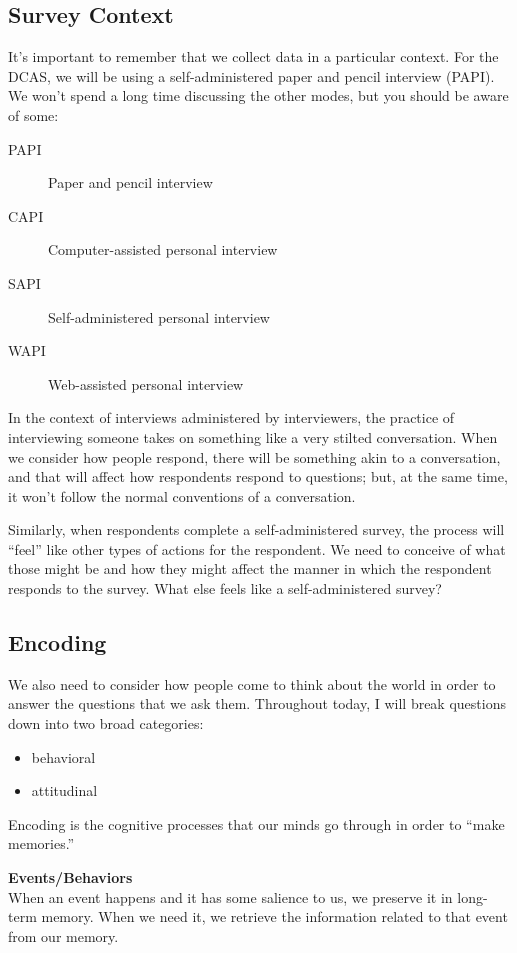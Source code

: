 \documentclass[11pt]{lecturenotes}
\begin{document}
\subsection[5]{Survey Context}
\slide
It's important to remember that we collect data in a particular context. For the DCAS, we will be using a self-administered paper and pencil interview (PAPI). We won't spend a long time discussing the other modes, but you should be aware of some: 

\begin{description}
\item[PAPI] Paper and pencil interview
\item[CAPI] Computer-assisted personal interview
\item[SAPI] Self-administered personal interview
\item[WAPI] Web-assisted personal interview
\end{description}

In the context of interviews administered by interviewers, the practice of interviewing someone takes on something like a very stilted conversation. When we consider how people respond, there will be something akin to a conversation, and that will affect how respondents respond to questions; but, at the same time, it won't follow the normal conventions of a conversation. 

Similarly, when respondents complete a self-administered survey, the process will ``feel'' like other types of actions for the respondent. We need to conceive of what those might be and how they might affect the manner in which the respondent responds to the survey. What else feels like a self-administered survey? 

\subsection[10]{Encoding}
\slide
We also need to consider how people come to think about the world in order to answer the questions that we ask them. Throughout today, I will break questions down into two broad categories: 
\begin{itemize}
\item behavioral 
\item attitudinal
\end{itemize}

Encoding is the cognitive processes that our minds go through in order to ``make memories.''

\textbf{Events\slash Behaviors}\\
When an event happens and it has some salience to us, we preserve it in long-term memory. When we need it, we retrieve the information related to that event from our memory. 
\end{document}
